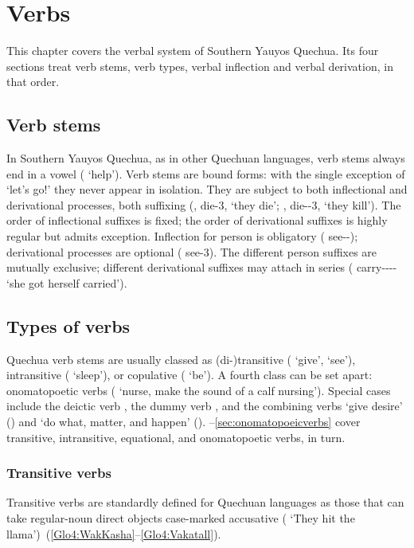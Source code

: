 \chapter{Verbs}\label{ch:verbs}
This chapter covers the verbal system of Southern Yauyos Quechua. Its four sections treat verb stems, verb types, verbal inflection and verbal derivation, in that order.

\section{Verb stems}\label{sec:verbstem}
In Southern Yauyos Quechua, as in other Quechuan languages, verb stems always end in a vowel ( ‘help’). Verb stems are bound forms: with the single exception of  ‘let’s go!’ they never appear in isolation. They are subject to both inflectional and derivational processes, both suffixing (, die-3, ‘they die’; , die--3, ‘they kill’). The order of inflectional suffixes is fixed; the order of derivational suffixes is highly regular but admits exception. Inflection for person is obligatory ( see--); derivational processes are optional ( see-3). The different person suffixes are mutually exclusive; different derivational suffixes may attach in series ( carry---- ‘she got herself carried’).

\section{Types of verbs}
Quechua verb stems are usually classed as (di-)transitive ( ‘give’,  ‘see’), intransitive ( ‘sleep’), or copulative ( ‘be’). A fourth class can be set apart: onomatopoetic verbs ( ‘nurse, make the sound of a calf nursing’). Special cases include the deictic verb , the dummy verb , and the combining verbs  ‘give desire’ () and  ‘do what, matter, and happen’ (). --\ref{sec:onomatopoeicverbs} cover transitive, intransitive, equational, and onomatopoetic verbs, in turn.

\largerpage
\subsection{Transitive verbs}\label{sec:transitiveverbs}
Transitive verbs are standardly defined for Quechuan languages as those that can take regular-noun direct objects case-marked accusative (  ‘They hit the llama’)~(\ref{Glo4:WakKasha}--\ref{Glo4:Vakatall}). 


